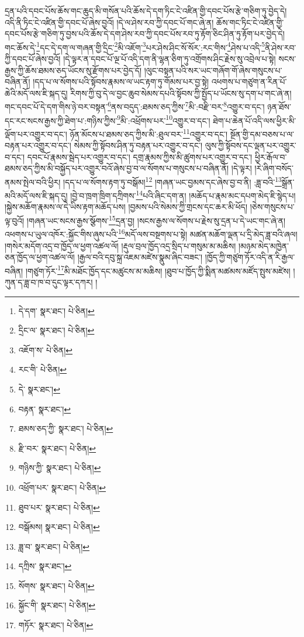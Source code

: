 དྲན་པའི་དབང་པོས་ཆོས་གང་ཆུད་མི་གསོན་པའི་ཆོས་དེ་དག་ཏིང་ངེ་འཛིན་གྱི་དབང་པོས་རྩེ་གཅིག་ཏུ་བྱེད་དེ། འདི་ནི་ཏིང་ངེ་འཛིན་གྱི་དབང་པོ་ཞེས་བྱའོ། །དེ་ལ་ཤེས་རབ་ཀྱི་དབང་པོ་གང་ཞེ་ན། ཆོས་གང་ཏིང་ངེ་འཛིན་གྱི་དབང་པོས་རྩེ་གཅིག་ཏུ་བྱས་པའི་ཆོས་དེ་དག་ཤེས་རབ་ཀྱི་དབང་པོས་རབ་ཏུ་རྟོག་ཅིང་ཤིན་ཏུ་རྟོག་པར་བྱེད་དེ། གང་ཆོས་དེ་\footnote{དེ་དག་  སྣར་ཐང་།  པེ་ཅིན། }དང་དེ་དག་ལ་གཞན་གྱི་དྲིང་\footnote{དྲིང་ལ་  སྣར་ཐང་།  པེ་ཅིན། }མི་འཇོག་\footnote{འཇོག་ས་  པེ་ཅིན། }པར་ཤེས་ཤིང་སོ་སོར་:རང་གིས་\footnote{རང་གི་  པེ་ཅིན། }ཤེས་པ་འདི་\footnote{དེ་  སྣར་ཐང་། }ནི་ཤེས་རབ་ཀྱི་དབང་པོ་ཞེས་བྱའོ། །དེ་ལྟར་ན་དབང་པོ་ལྔ་པོ་འདི་དག་ནི་ལྷན་ཅིག་ཏུ་འགྲོགས་ཤིང་རྗེས་སུ་འབྲེལ་པ་སྟེ། སངས་རྒྱས་ཀྱི་ཆོས་ཐམས་ཅད་ཡོངས་སུ་རྫོགས་པར་བྱེད་དོ། །ལུང་བསྟན་པའི་སར་ཡང་གཞོག་གོ་ཞེས་གསུངས་པ་བཞིན་ནོ། །དད་པ་ལ་སོགས་པའི་སྟོབས་རྣམས་ལ་ཡང་རྟག་ཏུ་གོམས་པར་བྱ་སྟེ། འཕགས་པ་གཙུག་ན་རིན་པོ་ཆེའི་མདོ་ལས་ཇི་སྐད་དུ། རིགས་ཀྱི་བུ་དེ་ལ་བྱང་ཆུབ་སེམས་དཔའི་སྟོབས་ཀྱི་སྤྱོད་པ་ཡོངས་སུ་དག་པ་གང་ཞེ་ན། གང་དབང་པོ་དེ་དག་གིས་ཉེ་བར་བསྟན་\footnote{བརྟན་  སྣར་ཐང་། }ནས་བདུད་:ཐམས་ཅད་ཀྱིས་\footnote{ཐམས་ཅད་ཀྱི་  སྣར་ཐང་།  པེ་ཅིན། }མི་:བརྫི་བར་\footnote{རྫི་བར་  སྣར་ཐང་།  པེ་ཅིན། }འགྱུར་བ་དང་། ཉན་ཐོས་དང་རང་སངས་རྒྱས་ཀྱི་ཐེག་པ་:གཉིས་ཀྱིས་\footnote{གཉིས་ཀྱི་  སྣར་ཐང་།  པེ་ཅིན། }མི་:འཕྲོགས་པར་\footnote{འཕྲོག་པར་  སྣར་ཐང་།  པེ་ཅིན། }འགྱུར་བ་དང་། ཐེག་པ་ཆེན་པོ་འདི་ལས་ཕྱིར་མི་ལྡོག་པར་འགྱུར་བ་དང་། ཉོན་མོངས་པ་ཐམས་ཅད་ཀྱིས་མི་:ཐུལ་བར་\footnote{ཐུབ་པར་  སྣར་ཐང་།  པེ་ཅིན། }འགྱུར་བ་དང་། སྔོན་གྱི་དམ་བཅས་པ་ལ་བརྟན་པར་འགྱུར་བ་དང་། སེམས་ཀྱི་སྟོབས་ཤིན་ཏུ་བརྟན་པར་འགྱུར་བ་དང་། ལུས་ཀྱི་སྟོབས་དང་ལྡན་པར་འགྱུར་བ་དང་། དབང་པོ་རྣམས་སྦེད་པར་འགྱུར་བ་དང་། དགྲ་རྣམས་ཀྱིས་མི་ཚུགས་པར་འགྱུར་བ་དང་། ཕྱིར་རྒོལ་བ་ཐམས་ཅད་ཀྱིས་མི་བསྐྱོད་པར་འགྱུར་བའོ་ཞེས་བྱ་བ་ལ་སོགས་པ་གསུངས་པ་བཞིན་ནོ། །དེ་ལྟར། །རེ་ཞིག་བསོད་ནམས་སྤེལ་བའི་ཕྱིར། །དད་པ་ལ་སོགས་རྟག་ཏུ་བསྒོམ།\footnote{བསྒོམས།  སྣར་ཐང་།  པེ་ཅིན། } །གཞན་ཡང་བྱམས་དང་ཞེས་བྱ་བ་ནི། :ཟླ་བའི་\footnote{ཟླ་བ་  སྣར་ཐང་།  པེ་ཅིན། }སྒྲོན་མའི་མདོ་ལས་ཇི་སྐད་དུ། །བྱེ་བ་ཁྲག་ཁྲིག་དཀྲིགས་\footnote{དཀྲིས་  སྣར་ཐང་། }པའི་ཞིང་དག་ན། །མཆོད་པ་རྣམ་མང་དཔག་མེད་ཇི་སྙེད་པ། །སྐྱེས་མཆོག་རྣམས་ལ་དེ་ཡིས་རྟག་མཆོད་པས། །བྱམས་པའི་སེམས་ཀྱི་གྲངས་དང་ཆར་མི་ཕོད། །ཅེས་གསུངས་པ་ལྟ་བུའོ། །གཞན་ཡང་སངས་རྒྱས་སྩོགས་\footnote{སོགས་  སྣར་ཐང་།  པེ་ཅིན། }དྲན་བྱ། །སངས་རྒྱས་ལ་སོགས་པ་རྗེས་སུ་དྲན་པ་དེ་ཡང་གང་ཞེ་ན། འཕགས་པ་ཡུལ་འཁོར་:སྐྱོང་གིས་ཞུས་པའི་\footnote{སྐྱོང་གི་  སྣར་ཐང་།  པེ་ཅིན། }མདོ་ལས་བསྔགས་པ་སྟེ། མཚན་མཆོག་ལྡན་པ་དྲི་མེད་ཟླ་བའི་ཞལ། །གསེར་མདོག་འདྲ་བ་ཁྱོད་ལ་ཕྱག་འཚལ་ལོ། །རྡུལ་བྲལ་ཁྱོད་འདྲ་སྲིད་པ་གསུམ་མ་མཆིས། །མཉམ་མེད་མཁྱེན་ཅན་ཁྱོད་ལ་ཕྱག་འཚལ་ལོ། །རྒྱལ་བའི་དབུ་སྐྲ་འཇམ་མཛེས་སྣུམ་ཞིང་བཟང་། །ཁྱོད་ཀྱི་གཙུག་ཏོར་འདི་ན་རི་རྒྱལ་བཞིན། །གཙུག་ཏོར་\footnote{གཏོར་  སྣར་ཐང་།  པེ་ཅིན། }མི་མཐོང་ཁྱོད་དང་མཚུངས་མ་མཆིས། །ཐུབ་པ་ཁྱོད་ཀྱི་སྨིན་མཚམས་མཛོད་སྤུས་མཛེས། །ཀུན་ད་ཟླ་བ་ཁ་བ་དུང་ལྟར་དཀར། །
